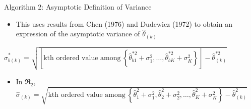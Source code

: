 \documentclass[
  11pt,
  ignorenonframetext,
]{beamer}
\providecommand{\tightlist}{%
  \setlength{\itemsep}{0pt}\setlength{\parskip}{0pt}}
\begin{document}
\begin{frame}{Algorithm 2: Asymptotic Definition of Variance}
\label{algorithm-2-asymptotic-definition-of-variance}
\begin{itemize}[<+->]
\tightlist
\item
  This uses results from Chen (1976) and Dudewicz (1972) to obtain an
  expression of the asymptotic variance of \(\hat{\theta}_{(k)}\)
\end{itemize}

\(\hat\sigma^*_{b(k)} = \sqrt{\left[\text{kth ordered value among} \ \left\{ \hat{\theta}^{*2}_{b1} + \sigma_1^2, \dots, \hat{\theta}^{*2}_{bK} + \sigma_K^2 \right\}\right] - \hat {\theta}^{*2}_{(k)}}\)

\begin{itemize}[<+->]
\tightlist
\item
  In \(\mathfrak{R}_2\),
  \(\hat\sigma_{(k)} = \sqrt{\text{kth ordered value among} \ \left\{ \hat{\theta}^{2}_{1} + \sigma_1^2, \hat{\theta}^{2}_{2} + \sigma_2^2, \dots, \hat{\theta}^{2}_{K} + \sigma_K^2 \right\} - \hat {\theta}^{2}_{(k)}}\)
\end{itemize}
\end{frame}
\end{document}
